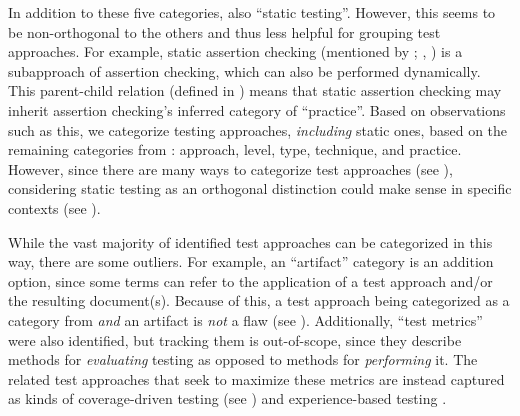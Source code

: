 \ifnotpaper
    \begin{landscape}
        \begin{table*}[hbtp!]
            \ieeeCatsTable{}
        \end{table*}
    \end{landscape}
\fi

In addition to these five categories, \citet[Fig.~2]{IEEE2022} also
 ``static testing''. However, this seems to be
non-orthogonal to the others and thus less helpful for grouping test approaches.
For example, static assertion checking (mentioned by \ifnotpaper
    \citealp[p.~345]{LahiriEtAl2013}; \citealp[p.~343]{ChalinEtAl2006}\else
    \citealp[p.~343]{ChalinEtAl2006}, \citealp[p.~345]{LahiriEtAl2013}\fi) is a
subapproach of assertion checking, which can also be performed dynamically.
This parent-child relation (defined in ) means that static
assertion checking may inherit assertion checking's inferred category of
``practice''. Based on observations such as this, we categorize testing
approaches, \emph{including} static ones, based on the remaining categories
from \citet{IEEE2022}: approach, level, type, technique, and practice.
\ifnotpaper However, since there are many ways to categorize test approaches
    (see ), considering static
    testing as an orthogonal distinction could make sense in specific contexts
    (see ).
\fi

While the vast majority of identified test approaches can be categorized
in this way, \ifnotpaper there are some outliers. For example, \fi
an ``artifact'' category is an addition option,
since some terms can refer to the application of
a test approach and/or the resulting document(s). Because of this, a test
approach being categorized as a category from 
\emph{and} an artifact is \emph{not} a flaw
(see ). \ifnotpaper
    Additionally, ``test metrics'' were also identified,
    but tracking them is out-of-scope, since they describe methods for
    \emph{evaluating} testing as opposed to methods for \emph{performing} it.
    The related test approaches that seek to maximize these metrics are instead
    captured as kinds of coverage-driven testing (see ) and
    experience-based testing \citep[p.~34]{IEEE2022}.

